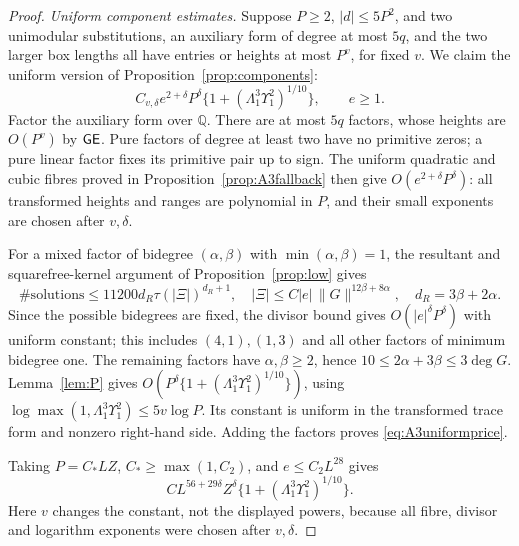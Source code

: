 \documentclass[11pt,reqno]{amsart}
\theoremstyle{definition}
\theoremstyle{remark}
\numberwithin{equation}{section}
\newcommand{\Q}{\mathbb Q}\newcommand{\C}{\mathbb C}
\begin{document}
\begin{proof}
\emph{Uniform component estimates.}
Suppose $P\ge2$, $|d|\le5P^2$, and two unimodular substitutions,
an auxiliary form of degree at most $5q$, and the two larger box lengths
all have entries or heights at most $P^v$, for fixed $v$.
We claim the uniform version of Proposition~\ref{prop:components}:
\begin{equation}\label{eq:A3uniformprice}
 C_{v,\delta}e^{2+\delta}P^\delta
 \{1+(\Lambda_1^3\Upsilon_1^2)^{1/10}\},\qquad e\ge1.
\end{equation}
Factor the auxiliary form over $\Q$. There are at most $5q$ factors,
whose heights are $O(P^v)$ by $\mathsf{GE}$. Pure factors of degree at least
two have no primitive zeros; a pure linear factor fixes its primitive
pair up to sign. The uniform quadratic and cubic fibres proved in
Proposition~\ref{prop:A3fallback} then give $O(e^{2+\delta}P^\delta)$:
all transformed heights and ranges are polynomial in $P$, and their
small exponents are chosen after $v,\delta$.

For a mixed factor of bidegree $(\alpha,\beta)$ with
$\min(\alpha,\beta)=1$, the resultant and squarefree-kernel argument
of Proposition~\ref{prop:low} gives
\[
 \#\text{solutions}\le11200d_R\tau(|\Xi|)^{d_R+1},\quad
 |\Xi|\le C|e|\,\|G\|^{12\beta+8\alpha},\quad d_R=3\beta+2\alpha.
\]
Since the possible bidegrees are fixed, the divisor bound gives
$O(|e|^\delta P^\delta)$ with uniform constant; this includes
$(4,1),(1,3)$ and all other factors of minimum bidegree one.
The remaining factors have $\alpha,\beta\ge2$, hence
$10\le2\alpha+3\beta\le3\deg G$. Lemma~\ref{lem:P} gives
$O(P^\delta\{1+(\Lambda_1^3\Upsilon_1^2)^{1/10}\})$, using
$\log\max(1,\Lambda_1^3\Upsilon_1^2)\le5v\log P$.
Its constant is uniform in the transformed trace form and nonzero
right-hand side. Adding the factors proves \eqref{eq:A3uniformprice}.

Taking $P=C_*LZ$, $C_*\ge\max(1,C_2)$, and $e\le C_2L^{28}$ gives
\begin{equation}\label{eq:A3cellprice}
 CL^{56+29\delta}Z^\delta
 \{1+(\Lambda_1^3\Upsilon_1^2)^{1/10}\}.
\end{equation}
Here $v$ changes the constant, not the displayed powers, because all
fibre, divisor and logarithm exponents were chosen after $v,\delta$.


\end{proof}
\end{document}
